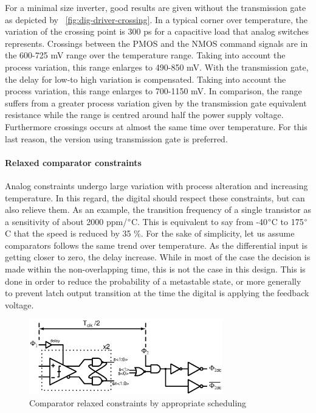 For a minimal size inverter, good results are given without the transmission gate as depicted by \figurename~\ref{fig:dig-driver-crossing}. In a typical corner over temperature, the variation of the crossing point is 300 ps for a capacitive load that analog switches represents. Crossings between the PMOS and the NMOS command signals are in the 600-725 mV range over the temperature range. Taking into account the process variation, this range enlarges to 490-850 mV. With the transmission gate, the delay for low-to high variation is compensated. Taking into account the process variation, this range enlarges to 700-1150 mV. In comparison, the range suffers from a greater process variation given by the transmission gate equivalent resistance while the range is centred around half the power supply voltage. Furthermore crossings occurs at almost the same time over temperature. For this last reason, the version using transmission gate is preferred.
\paragraph{Relaxed comparator constraints}

Analog constraints undergo large variation with process alteration and increasing temperature. In this regard, the digital should respect these constraints, but can also relieve them. As an example, the transition frequency of a single transistor as a sensitivity of about 2000 ppm/\(\degree \)C. This is equivalent to say from -40\(\degree \)C to 175\(\degree \)C that the speed is reduced by 35 \%. For the sake of simplicity, let us assume comparators follows the same trend over temperature. As the differential input is getting closer to zero, the delay increase. While in most of the case the decision is made within the non-overlapping time, this is not the case in this design. This is done in order to reduce the probability of a metastable state, or more generally to prevent latch output transition at the time the digital is applying the feedback voltage.
\begin{figure}[htp]
	\centering
	\includegraphics[width=0.75\textwidth]{Chapter4/Figs/comp-timing-isd.ps}
	\caption{Comparator relaxed constraints by appropriate scheduling}
	\label{fig:comp-timing}
\end{figure}

